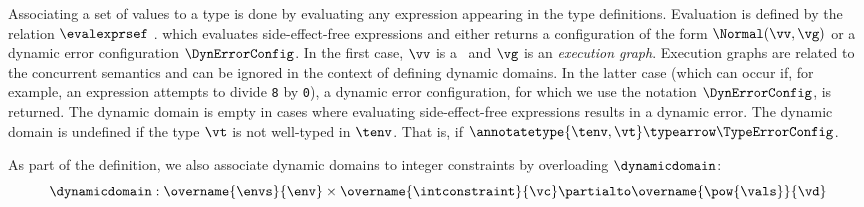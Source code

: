 Associating a set of values to a type is done by evaluating any expression appearing
in the type definitions. Evaluation is defined by the relation $\evalexprsef\ $.
which evaluates side-effect-free expressions and either returns
a configuration of the form $\Normal(\vv,\vg)$ or a dynamic error configuration $\DynErrorConfig$.
In the first case, $\vv$ is a \nativevalue\ and $\vg$
is an \emph{execution graph}. Execution graphs are related to the concurrent semantics
and can be ignored in the context of defining dynamic domains.
In the latter case (which can occur if, for example, an expression attempts to divide
\texttt{8} by \texttt{0}), a dynamic error configuration, for which we use the notation
$\DynErrorConfig$, is returned.
%
The dynamic domain is empty in cases where evaluating side-effect-free expressions
results in a dynamic error.
%
The dynamic domain is undefined if the type $\vt$ is not well-typed in $\tenv$.
That is, if $\annotatetype{\tenv, \vt} \typearrow \TypeErrorConfig$.

As part of the definition, we also associate dynamic domains to integer constraints
by overloading $\dynamicdomain$:
\[
  \dynamicdomain : \overname{\envs}{\env} \times \overname{\intconstraint}{\vc}
  \partialto \overname{\pow{\vals}}{\vd}
\]

